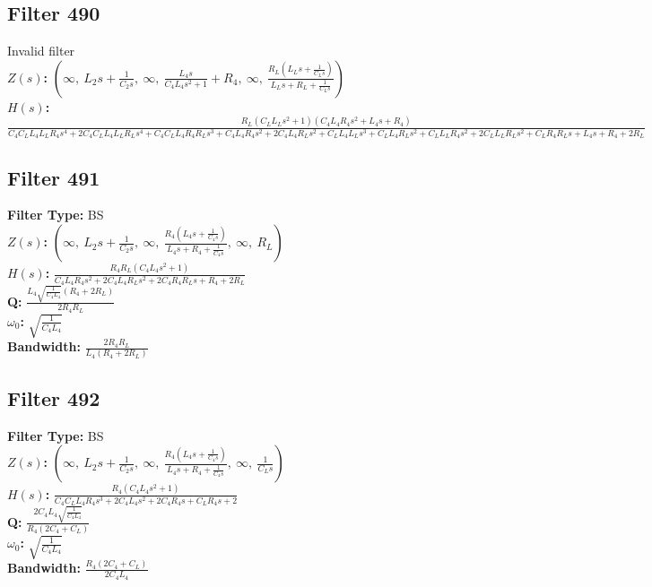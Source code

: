 \documentclass{article}
\begin{document}
\subsection*{Filter 490}
Invalid filter \\ 
\textbf{$Z(s)$:} $\left( \infty, \  L_{2} s + \frac{1}{C_{2} s}, \  \infty, \  \frac{L_{4} s}{C_{4} L_{4} s^{2} + 1} + R_{4}, \  \infty, \  \frac{R_{L} \left(L_{L} s + \frac{1}{C_{L} s}\right)}{L_{L} s + R_{L} + \frac{1}{C_{L} s}}\right)$ \\ 
\textbf{$H(s)$:} $\frac{R_{L} \left(C_{L} L_{L} s^{2} + 1\right) \left(C_{4} L_{4} R_{4} s^{2} + L_{4} s + R_{4}\right)}{C_{4} C_{L} L_{4} L_{L} R_{4} s^{4} + 2 C_{4} C_{L} L_{4} L_{L} R_{L} s^{4} + C_{4} C_{L} L_{4} R_{4} R_{L} s^{3} + C_{4} L_{4} R_{4} s^{2} + 2 C_{4} L_{4} R_{L} s^{2} + C_{L} L_{4} L_{L} s^{3} + C_{L} L_{4} R_{L} s^{2} + C_{L} L_{L} R_{4} s^{2} + 2 C_{L} L_{L} R_{L} s^{2} + C_{L} R_{4} R_{L} s + L_{4} s + R_{4} + 2 R_{L}}$ \\ 
\subsection*{Filter 491}
\textbf{Filter Type:} BS \\ 
\textbf{$Z(s)$:} $\left( \infty, \  L_{2} s + \frac{1}{C_{2} s}, \  \infty, \  \frac{R_{4} \left(L_{4} s + \frac{1}{C_{4} s}\right)}{L_{4} s + R_{4} + \frac{1}{C_{4} s}}, \  \infty, \  R_{L}\right)$ \\ 
\textbf{$H(s)$:} $\frac{R_{4} R_{L} \left(C_{4} L_{4} s^{2} + 1\right)}{C_{4} L_{4} R_{4} s^{2} + 2 C_{4} L_{4} R_{L} s^{2} + 2 C_{4} R_{4} R_{L} s + R_{4} + 2 R_{L}}$ \\ 
\textbf{Q:} $\frac{L_{4} \sqrt{\frac{1}{C_{4} L_{4}}} \left(R_{4} + 2 R_{L}\right)}{2 R_{4} R_{L}}$ \\ 
\textbf{$\omega_0$:} $\sqrt{\frac{1}{C_{4} L_{4}}}$ \\ 
\textbf{Bandwidth:} $\frac{2 R_{4} R_{L}}{L_{4} \left(R_{4} + 2 R_{L}\right)}$ \\ 
\subsection*{Filter 492}
\textbf{Filter Type:} BS \\ 
\textbf{$Z(s)$:} $\left( \infty, \  L_{2} s + \frac{1}{C_{2} s}, \  \infty, \  \frac{R_{4} \left(L_{4} s + \frac{1}{C_{4} s}\right)}{L_{4} s + R_{4} + \frac{1}{C_{4} s}}, \  \infty, \  \frac{1}{C_{L} s}\right)$ \\ 
\textbf{$H(s)$:} $\frac{R_{4} \left(C_{4} L_{4} s^{2} + 1\right)}{C_{4} C_{L} L_{4} R_{4} s^{3} + 2 C_{4} L_{4} s^{2} + 2 C_{4} R_{4} s + C_{L} R_{4} s + 2}$ \\ 
\textbf{Q:} $\frac{2 C_{4} L_{4} \sqrt{\frac{1}{C_{4} L_{4}}}}{R_{4} \left(2 C_{4} + C_{L}\right)}$ \\ 
\textbf{$\omega_0$:} $\sqrt{\frac{1}{C_{4} L_{4}}}$ \\ 
\textbf{Bandwidth:} $\frac{R_{4} \left(2 C_{4} + C_{L}\right)}{2 C_{4} L_{4}}$ \\ 
\end{document}
